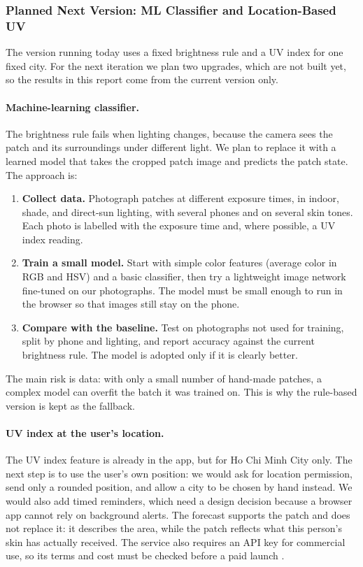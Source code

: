 \subsubsection{Planned Next Version: ML Classifier and Location-Based UV}\label{sec:planned-ml}
The version running today uses a fixed brightness rule and a UV index for one fixed city. For the
next iteration we plan two upgrades, which are not built yet, so the results in this report come
from the current version only.

\paragraph{Machine-learning classifier.}
The brightness rule fails when lighting changes, because the camera sees the patch and its
surroundings under different light. We plan to replace it with a learned model that takes the
cropped patch image and predicts the patch state. The approach is:
\begin{enumerate}[itemsep=0pt]
  \item \textbf{Collect data.} Photograph patches at different exposure times, in indoor, shade,
    and direct-sun lighting, with several phones and on several skin tones. Each photo is labelled
    with the exposure time and, where possible, a UV index reading.
  \item \textbf{Train a small model.} Start with simple color features (average color in RGB and HSV)
    and a basic classifier, then try a lightweight image network fine-tuned on our photographs. The
    model must be small enough to run in the browser so that images still stay on the phone.
  \item \textbf{Compare with the baseline.} Test on photographs not used for training, split by
    phone and lighting, and report accuracy against the current brightness rule. The model is adopted
    only if it is clearly better.
\end{enumerate}
The main risk is data: with only a small number of hand-made patches, a complex model can overfit
the batch it was trained on. This is why the rule-based version is kept as the fallback.

\paragraph{UV index at the user's location.}
The UV index feature is already in the app, but for Ho Chi Minh City only. The next step is to use
the user's own position: we would ask for location permission, send only a rounded position, and
allow a city to be chosen by hand instead. We would also add timed reminders, which need a design
decision because a browser app cannot rely on background alerts. The forecast supports the patch and
does not replace it: it describes the area, while the patch reflects what this person's skin has
actually received. The service also requires an API key for commercial use, so its terms and cost
must be checked before a paid launch \cite{openmeteo2026}.

